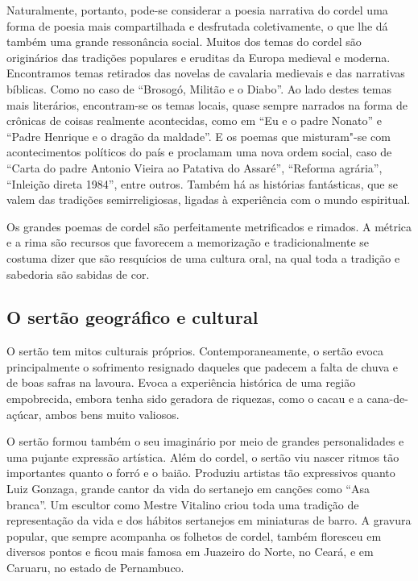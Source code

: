 Naturalmente, portanto, pode-se considerar a poesia narrativa do cordel
uma forma de poesia mais compartilhada e desfrutada coletivamente, o
que lhe dá também uma grande ressonância social. Muitos dos temas do
cordel são originários das tradições populares e eruditas da Europa
medieval e moderna. Encontramos temas retirados das novelas de
cavalaria medievais e das narrativas bíblicas. Como no caso de
``Brosogó, Militão e o Diabo''. Ao lado destes temas
mais literários, encontram-se os temas locais, quase sempre narrados na
forma de crônicas de coisas realmente acontecidas, como em
``Eu e o padre Nonato'' e “Padre Henrique e o dragão da maldade”.
E os poemas que misturam"-se com acontecimentos políticos do país
e proclamam uma nova ordem social, caso de ``Carta do padre Antonio Vieira ao Patativa do Assaré'', ``Reforma agrária'', ``Inleição direta 1984'', entre outros.
Também há as histórias fantásticas, que
se valem das tradições semirreligiosas, ligadas à experiência com o
mundo espiritual. 

Os grandes poemas de cordel são perfeitamente metrificados e rimados. A
métrica e a rima são recursos que favorecem a memorização e
tradicionalmente se costuma dizer que são resquícios de uma cultura
oral, na qual toda a tradição e sabedoria são sabidas de cor. 


\subsection{O sertão geográfico e cultural}

O sertão tem mitos culturais próprios. Contemporaneamente, o sertão
evoca principalmente o sofrimento resignado daqueles que padecem a
falta de chuva e de boas safras na lavoura. Evoca a experiência
histórica de uma região empobrecida, embora tenha sido geradora de
riquezas, como o cacau e a cana-de-açúcar, ambos bens muito valiosos. 

O sertão formou também o seu imaginário por meio de grandes
personalidades e uma pujante expressão artística. Além do cordel, o
sertão viu nascer ritmos tão importantes quanto o forró e o baião.
Produziu artistas tão expressivos quanto Luiz Gonzaga, grande cantor da
vida do sertanejo em canções como ``Asa
branca''. Um escultor como Mestre Vitalino criou toda
uma tradição de representação da vida e dos hábitos sertanejos em
miniaturas de barro. A gravura popular, que sempre acompanha os
folhetos de cordel, também floresceu em diversos pontos e ficou mais
famosa em Juazeiro do Norte, no Ceará, e em Caruaru, no estado de
Pernambuco. 

